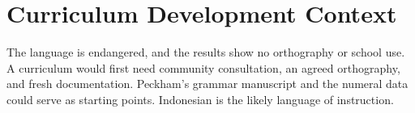 \documentclass[12pt]{article}
\begin{document}
\section{Curriculum Development Context}
The language is endangered, and the results show no orthography or school use. A curriculum would first need community consultation, an agreed orthography, and fresh documentation. Peckham's grammar manuscript and the numeral data could serve as starting points. Indonesian is the likely language of instruction.
\end{document}
